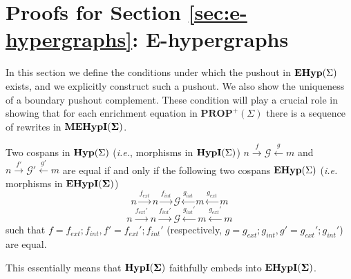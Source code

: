 \section{Proofs for Section \ref{sec:e-hypergraphs}: E-hypergraphs}
\label{sec:appendix:pushout}

In this section we define the conditions under which the pushout in $\mathbf{EHyp}(\Sigma)$ exists, and we explicitly construct such a pushout.
We also show the uniqueness of a boundary pushout complement.
These condition will play a crucial role in showing that for each enrichment equation in $\textbf{PROP}^{+}(\Sigma)$ there is a sequence of rewrites in ${\mathbf{MEHypI(\Sigma)}}$.

\begin{proposition}
    Two cospans in $\mathbf{Hyp}(\Sigma)$ (\textit{i.e.}, morphisms in $\textbf{HypI}(\Sigma)$) $n \xrightarrow{f} \mathcal{G} \xleftarrow{g} m$ and $n \xrightarrow{f'} \mathcal{G}' \xleftarrow{g'} m$ are equal if and only if
    the following two cospans  $\mathbf{EHyp}(\Sigma)$ (\textit{i.e.} morphisms in ${\mathbf{EHypI(\Sigma)}}$)
    \[
    n \xrightarrow{f_{ext}} n \xrightarrow{f_{int}} \mathcal{G} \xleftarrow{g_{int}} m \xleftarrow{g_{ext}} m
    \]
    \[
        n \xrightarrow{f_{ext}'} n \xrightarrow{f_{int}'} \mathcal{G} \xleftarrow{g_{int}'} m \xleftarrow{g_{ext}'} m    
    \]
    such that $f = f_{ext};f_{int}, f'=f_{ext}';f_{int}'$ (respectively, $g = g_{ext};g_{int}, g' = g_{ext}';g_{int}'$) are equal.
\end{proposition}
This essentially means that $\mathbf{\textbf{HypI}(\Sigma)}$ faithfully embeds into ${\mathbf{EHypI(\Sigma)}}$. 
